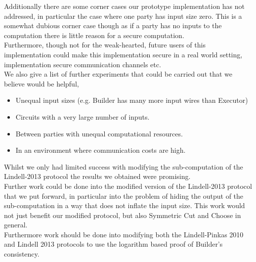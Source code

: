 \documentclass[ %
                    author={Nicholas Tutte},
                supervisor={Prof. Nigel Smart},
                    degree={MEng},
                     title={Secure Two Party Computation},
                  subtitle={A practical comparison of recent protocols},
                      type={Research - GG1K},
                      year={2015} ]{dissertation}
\begin{document}
			Additionally there are some corner cases our prototype implementation has not addressed, in particular the case where one party has input size zero. This is a somewhat dubious corner case though as if a party has no inputs to the computation there is little reason for a secure computation.\\

			Furthermore, though not for the weak-hearted, future users of this implementation could make this implementation secure in a real world setting, implementation secure communication channels etc.\\

			We also give a list of further experiments that could be carried out that we believe would be helpful,

			\begin{itemize}
				\item Unequal input sizes (e.g. Builder has many more input wires than Executor)
				\item Circuits with a very large number of inputs.
				\item Between parties with unequal computational resources.
				\item In an environment where communication costs are high.
			\end{itemize}

			Whilst we only had limited success with modifying the sub-computation of the Lindell-2013 protocol the results we obtained were promising.\\

			Further work could be done into the modified version of the Lindell-2013 protocol that we put forward, in particular into the problem of hiding the output of the sub-computation in a way that does not inflate the input size. This work would not just benefit our modified protocol, but also Symmetric Cut and Choose in general.\\

			Furthermore work should be done into modifying both the Lindell-Pinkas 2010 and Lindell 2013 protocols to use the logarithm based proof of Builder's consistency.
\end{document}
